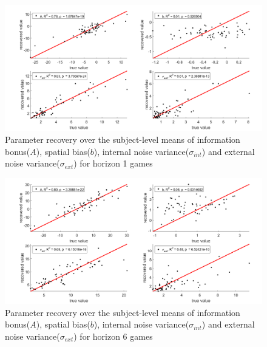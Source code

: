 \documentclass[12pt]{article}
\begin{document}
	\begin{figure}[H]
		\begin{center}
			\includegraphics[width=1\textwidth]{figures/paramrecover_1.png}
			\caption{Parameter recovery over the subject-level means of information bonus($A$), spatial bias($b$), internal noise variance($\sigma_{int}$) and external noise variance($\sigma_{ext}$) for horizon 1 games}
			\label{fig:pararecover1}
		\end{center}
	\end{figure} 
	
	\begin{figure}[H]
		\begin{center}
			\includegraphics[width=1\textwidth]{figures/paramrecover_2.png}
			\caption{Parameter recovery over the subject-level means of information bonus($A$), spatial bias($b$), internal noise variance($\sigma_{int}$) and external noise variance($\sigma_{ext}$) for horizon 6 games}
			\label{fig:pararecover2}
		\end{center}
	\end{figure}
	
	
	
	
	
	
	
	\cleardoublepage
	\ifdefined{}
	\else
	\fi
	
\end{document}

